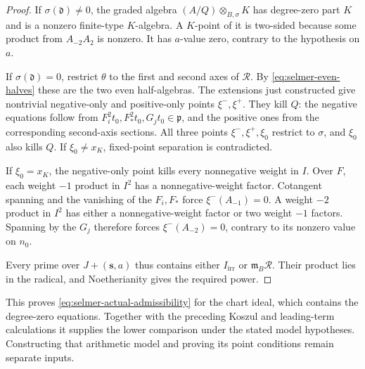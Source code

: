 \begin{proof}
If $\sigma(\mathfrak d)\ne0$, the graded algebra
$(A/Q)\otimes_{B,\sigma}K$ has degree-zero part $K$ and is a
nonzero finite-type $K$-algebra. A $K$-point of it is two-sided because
some product from $A_{-2}A_2$ is nonzero. It has $a$-value zero,
contrary to the hypothesis on $a$.

If $\sigma(\mathfrak d)=0$, restrict $\theta$ to the first and
second axes of $\mathcal R$. By \eqref{eq:selmer-even-halves} these
are the two even half-algebras. The extensions just constructed give
nontrivial negative-only and positive-only points $\xi^-,\xi^+$.
They kill $Q$: the negative equations follow from
$F_i^2t_0,F_*^2t_0,G_jt_0\in\mathfrak p$, and the positive
ones from the corresponding second-axis sections. All three points
$\xi^-,\xi^+,\xi_0$ restrict to $\sigma$, and $\xi_0$ also kills
$Q$. If $\xi_0\ne x_K$, fixed-point separation is contradicted.

If $\xi_0=x_K$, the negative-only point kills every nonnegative
weight in $I$. Over $F$, each weight $-1$ product in $I^2$ has a
nonnegative-weight factor. Cotangent spanning and the vanishing of the
$F_i,F_*$ force $\xi^-(A_{-1})=0$. A weight $-2$ product in $I^2$
has either a nonnegative-weight factor or two weight $-1$ factors.
Spanning by the $G_j$ therefore forces $\xi^-(A_{-2})=0$, contrary
to its nonzero value on $n_0$.

Every prime over $J+(\boldsymbol s,a)$ thus contains either
$I_{\mathrm{irr}}$ or $\mathfrak m_B\mathcal R$. Their product
lies in the radical, and Noetherianity gives the required power.
\end{proof}

This proves \eqref{eq:selmer-actual-admissibility} for the chart ideal,
which contains the degree-zero equations. Together with the preceding
Koszul and leading-term calculations it supplies the lower comparison
under the stated model hypotheses. Constructing that arithmetic model
and proving its point conditions remain separate inputs.

